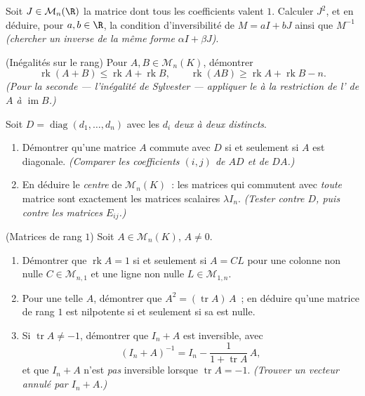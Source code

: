 \begin{exercise}[$\star\star\star$]\label{exo:b1:matrices:9}
Soit $J \in \mathcal{M}_n(\R)$ la matrice dont tous les coefficients
valent $1$. Calculer $J^2$, et en déduire, pour $a, b \in \R$, la
condition d'inversibilité de $M = aI + bJ$ ainsi que $M^{-1}$
\emph{(chercher un inverse de la même forme $\alpha I + \beta J$)}.
\end{exercise}

\begin{exercise}[$\star\star\star$]\label{exo:b1:matrices:10}
(Inégalités sur le rang) Pour $A, B \in \mathcal{M}_n(K)$, démontrer
\[
\operatorname{rk}(A + B) \leq \operatorname{rk} A +
\operatorname{rk} B,
\qquad
\operatorname{rk}(AB) \geq \operatorname{rk} A + \operatorname{rk}
B - n .
\]
\emph{(Pour la seconde --- l'inégalité de Sylvester --- appliquer le
 à la restriction de l' de $A$ à
$\operatorname{im} B$.)}
\end{exercise}

\begin{exercise}[$\star\star$]\label{exo:b1:matrices:11}
Soit $D = \operatorname{diag}(d_1, \dots, d_n)$ avec les $d_i$
\emph{deux à deux distincts}.
\begin{enumerate}
  \item Démontrer qu'une matrice $A$ commute avec $D$ si et seulement
        si $A$ est diagonale. \emph{(Comparer les coefficients $(i,j)$
        de $AD$ et de $DA$.)}
  \item En déduire le \emph{centre} de $\mathcal{M}_n(K)$~: les
        matrices qui commutent avec \emph{toute} matrice sont
        exactement les matrices scalaires $\lambda I_n$. \emph{(Tester
        contre $D$, puis contre les matrices $E_{ij}$.)}
\end{enumerate}
\end{exercise}

\begin{exercise}[$\star\star\star$]\label{exo:b1:matrices:12}
(Matrices de rang $1$) Soit $A \in \mathcal{M}_n(K)$, $A \neq 0$.
\begin{enumerate}
  \item Démontrer que $\operatorname{rk} A = 1$ si et seulement si $A =
        CL$ pour une colonne non nulle $C \in \mathcal{M}_{n,1}$ et une
        ligne non nulle $L \in \mathcal{M}_{1,n}$.
  \item Pour une telle $A$, démontrer que $A^2 = (\operatorname{tr}
        A)\,A$~; en déduire qu'une matrice de rang $1$ est nilpotente
        si et seulement si sa  est nulle.
  \item Si $\operatorname{tr} A \neq -1$, démontrer que $I_n + A$ est
        inversible, avec
        \[
        (I_n + A)^{-1} = I_n - \frac{1}{1 + \operatorname{tr}
        A}\,A ,
        \]
        et que $I_n + A$ n'est \emph{pas} inversible lorsque
        $\operatorname{tr} A = -1$. \emph{(Trouver un vecteur annulé
        par $I_n + A$.)}
\end{enumerate}
\end{exercise}

